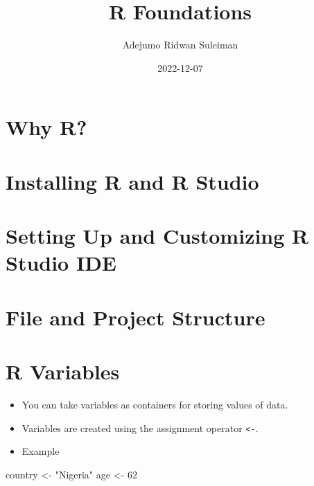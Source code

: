 \documentclass[
]{article}
\title{R Foundations}
\author{Adejumo Ridwan Suleiman}
\date{2022-12-07}
\newenvironment{Shaded}{\begin{snugshade}}{\end{snugshade}}
\newcommand{\DecValTok}[1]{\textcolor[rgb]{0.00,0.00,0.81}{#1}}
\newcommand{\NormalTok}[1]{#1}
\newcommand{\OtherTok}[1]{\textcolor[rgb]{0.56,0.35,0.01}{#1}}
\newcommand{\StringTok}[1]{\textcolor[rgb]{0.31,0.60,0.02}{#1}}
\providecommand{\tightlist}{%
  \setlength{\itemsep}{0pt}\setlength{\parskip}{0pt}}
\begin{document}
\maketitle

\hypertarget{why-r}{%
\section{Why R?}\label{why-r}}

\hypertarget{installing-r-and-r-studio}{%
\section{Installing R and R Studio}\label{installing-r-and-r-studio}}

\hypertarget{setting-up-and-customizing-r-studio-ide}{%
\section{Setting Up and Customizing R Studio
IDE}\label{setting-up-and-customizing-r-studio-ide}}

\hypertarget{file-and-project-structure}{%
\section{File and Project Structure}\label{file-and-project-structure}}

\hypertarget{r-variables}{%
\section{R Variables}\label{r-variables}}

\begin{itemize}
\tightlist
\item
  You can take variables as containers for storing values of data.\\
\item
  Variables are created using the assignment operator
  \texttt{\textless{}-}.\\
\item
  Example
\end{itemize}

\begin{Shaded}
\begin{Highlighting}[]
\NormalTok{country }\OtherTok{\textless{}{-}} \StringTok{"Nigeria"}
\NormalTok{age }\OtherTok{\textless{}{-}} \DecValTok{62}
\end{Highlighting}
\end{Shaded}
\end{document}
